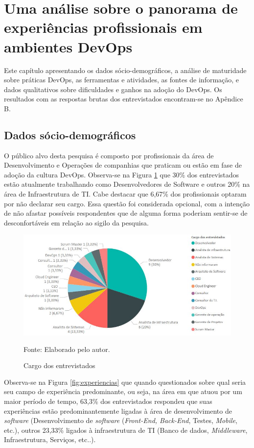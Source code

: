 \documentclass[twoside,english,brazilian]{UNISINOSartigo}
\newcommand{\source}[1]{\caption*{Fonte: {#1}} }
\begin{document}
\section{Uma análise sobre o panorama de experiências profissionais em ambientes DevOps}
Este capítulo apresentando os dados sócio-demográficos, a análise de maturidade sobre práticas DevOps, as ferramentas e atividades, as fontes de informação, e dados qualitativos sobre dificuldades e ganhos na adoção do DevOps. Os resultados com as respostas brutas dos entrevistados encontram-se no Apêndice B.


\subsection{Dados sócio-demográficos}
O público alvo desta pesquisa é composto por profissionais da área de Desenvolvimento e Operações de companhias que praticam ou estão em fase de adoção da cultura DevOps. Observa-se na Figura \ref{fig:cargos} que 30\% dos entrevistados estão atualmente trabalhando como Desenvolvedores de Software e outros 20\% na área de Infraestrutura de TI.  Cabe destacar que 6,67\% dos profissionais optaram por não declarar seu cargo. Essa questão foi considerada opcional, com a intenção de não afastar possíveis respondentes que de alguma forma poderiam sentir-se de desconfortáveis em relação ao sigilo da pesquisa. 
\begin{figure}[H]
    \centering
    \caption{Cargo dos entrevistados}
       \includegraphics[scale=.6]{imagens/cargos_pbi.JPG}
       \source{Elaborado pelo autor.}
    \label{fig:cargos}
\end{figure}
Observa-se na Figura \ref{fig:experiencias} que quando questionados sobre qual seria seu campo de experiência predominante, ou seja, na área em que atuou por um maior período de tempo, 63,3\% dos entrevistados respondeu que suas experiências estão predominantemente ligadas à área de desenvolvimento de \textit{software} (Desenvolvimento de \textit{software} (\textit{Front-End, Back-End}, Testes, \textit{Mobile}, etc.), outros 23,33\% ligados à infraestrutura de TI (Banco de dados, \textit{Middleware}, Infraestrutura, Serviços, etc..).
\end{document}
